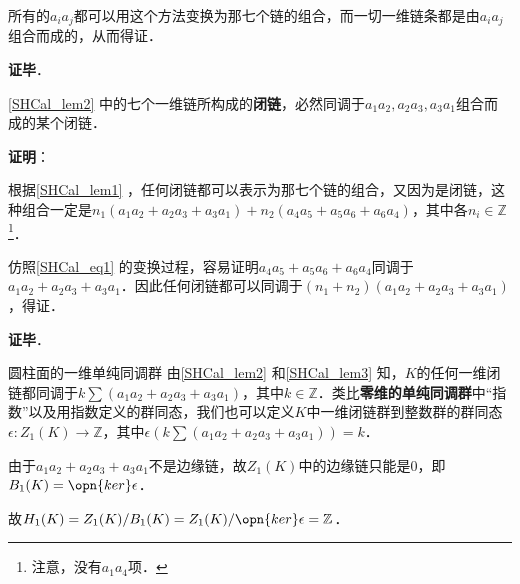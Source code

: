 所有的$a_ia_j$都可以用这个方法变换为那七个链的组合，而一切一维链条都是由$a_ia_j$组合而成的，从而得证．

\textbf{证毕}．

\begin{lemma}{}\label{SHCal_lem3}
\autoref{SHCal_lem2} 中的七个一维链所构成的\textbf{闭链}，必然同调于$a_1a_2, a_2a_3, a_3a_1$组合而成的某个闭链．
\end{lemma}

\textbf{证明}：


根据\autoref{SHCal_lem1} ，任何闭链都可以表示为那七个链的组合，又因为是闭链，这种组合一定是$n_1(a_1a_2+a_2a_3+a_3a_1)+n_2(a_4a_5+a_5a_6+a_6a_4)$，其中各$n_i\in\mathbb{Z}$\footnote{注意，没有$a_1a_4$项．}．

仿照\autoref{SHCal_eq1} 的变换过程，容易证明$a_4a_5+a_5a_6+a_6a_4$同调于$a_1a_2+a_2a_3+a_3a_1$．因此任何闭链都可以同调于$(n_1+n_2)(a_1a_2+a_2a_3+a_3a_1)$，得证．


\textbf{证毕}．

\begin{corollary}{圆柱面的一维单纯同调群}
由\autoref{SHCal_lem2} 和\autoref{SHCal_lem3} 知，$K$的任何一维闭链都同调于$k\sum (a_1a_2+a_2a_3+a_3a_1)$，其中$k\in\mathbb{Z}$．类比\textbf{零维的单纯同调群}中“指数”以及用指数定义的群同态，我们也可以定义$K$中一维闭链群到整数群的群同态$\epsilon: Z_1(K)\to \mathbb{Z}$，其中$\epsilon(k\sum (a_1a_2+a_2a_3+a_3a_1))=k$．

由于$a_1a_2+a_2a_3+a_3a_1$不是边缘链，故$Z_1(K)$中的边缘链只能是$0$，即$B_1(K)=\opn{ker}\epsilon$．

故$H_1(K)=Z_1(K)/B_1(K)=Z_1(K)/\opn{ker}\epsilon=\mathbb{Z}$．
\end{corollary}



















